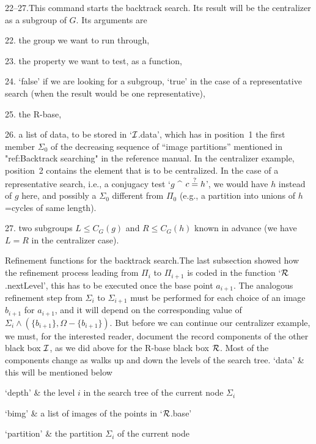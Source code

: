22--27.\enspace This command starts the backtrack search. Its result will
be the centralizer as a subgroup of $G$. Its arguments are
\beginlist
  \item{22.} the group we want to run through,
  \item{23.} the property we want to test, as a {\GAP} function,
  \item{24.} `false' if we are looking for a subgroup, `true' in the case
    of   a  representative  search    (when  the result   would    be one
    representative),
  \item{25.} the R-base,
  \item{26.} a list  of data, to be stored  in `${\cal I}$.data', which has
    in position~1 the first member $\Sigma_0$  of the decreasing sequence
    of ``image partitions'' mentioned in "ref:Backtrack searching" in the
    reference manual. In the centralizer example, position~2 contains the
    element that is  to be centralized. In the  case of  a representative
    search,  i.e.,  a conjugacy test  `$g$  ^ $c \buildrel?\over= h$', we
    would  have $h$   instead of  $g$   here, and   possibly a $\Sigma_0$
    different from $\Pi_0$ (e.g., a  partition into unions of  $h$=cycles
    of same length).
  \item{27.} two subgroups  $L\le  C_G(g)$  and  $R\le  C_G(h)$ known  in
    advance (we have $L=R$ in the centralizer case).
\endlist

\medskip
{\bsf Refinement  functions   for the  backtrack  search.}\quad  The last
subsection showed   how the refinement   process leading from  $\Pi_i$ to
$\Pi_{i+1}$  is coded in the  function  `${\cal R}$.nextLevel', this  has to be
executed once the  base point  $a_{i+1}$.  The analogous refinement  step
from $\Sigma_i$ to $\Sigma_{i+1}$ must be performed for each choice of an
image $b_{i+1}$ for  $a_{i+1}$, and it will  depend  on the corresponding
value of $\Sigma_i\wedge  (\{b_{i+1}\}, \Omega-\{b_{i+1}\})$. But  before
we  can continue  our centralizer example,  we  must,  for the interested
reader, document the record components of the other black box ${\cal I}$, as we
did above for the R-base black box ${\cal R}$. Most of the components change as
{\GAP} walks up and down the levels of the search tree.
\beginitems
`data' &
    this will be mentioned below

`depth' &
    the level $i$ in the search tree of the current node $\Sigma_i$

`bimg' &
    a list of images of the points in `${\cal R}$.base'

`partition' &
    the partition $\Sigma_i$ of the current node

